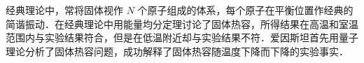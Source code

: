 
经典理论中，常将固体视作 $N$ 个原子组成的体系，每个原子在平衡位置作经典的简谐振动．在经典理论中用能量均分定理讨论了固体热容，所得结果在高温和室温范围内与实验结果符合，但是在低温附近却与实验结果不符．爱因斯坦首先用量子理论分析了固体热容问题，成功解释了固体热容随温度下降而下降的实验事实．